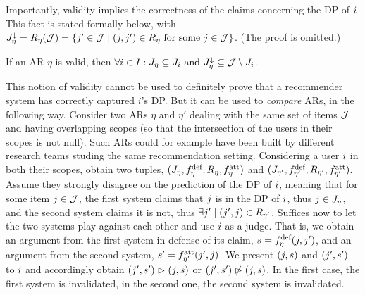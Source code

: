 \documentclass[version=3.21, pagesize, twoside=off, bibliography=totoc, DIV=calc, fontsize=12pt, a4paper, french, english]{scrartcl}
\begin{document}
Importantly, validity implies the correctness of the claims concerning the \ac{DP} of $\usr$  This fact is stated formally below, with $\mnitems = R_\eta(\allitems) = \set{\itm' \in \allitems \suchthat (\itm, \itm') \in R_\eta \text{ for some } \itm \in \allitems}$. (The proof is omitted.) 
\begin{theorem}
	If an \ac{AR} $\eta$ is valid, then $\forall \usr \in \allusers: \mitems \subseteq \uitems \text{ and } \mnitems \subseteq \allitems \setminus \uitems$.
\end{theorem}

This notion of validity cannot be used to definitely prove that a recommender system has correctly captured $i$’s \ac{DP}. But it can be used to \emph{compare} \acp{AR}, in the following way. Consider two \acp{AR} $\eta$ and $\eta'$ dealing with the same set of items $\allitems$ and having overlapping scopes (so that the intersection of the users in their scopes is not null). Such \acp{AR} could for example have been built by different research teams studing the same recommendation setting. Considering a user $\usr$ in both their scopes, obtain two tuples, $(\mitems, \mdef, R_\eta, \matt)$ and $(\mitems[\eta'], \mdef[\eta'], R_{\eta'}, \matt[\eta'])$. Assume they strongly disagree on the prediction of the \ac{DP} of $\usr$, meaning that for some item $\itm \in \allitems$, the first system claims that $\itm$ is in the \ac{DP} of $\usr$, thus $\itm \in \mitems$, and the second system claims it is not, thus $\exists \itm' \suchthat (\itm', \itm) \in R_{\eta'}$. Suffices now to let the two systems play against each other and use $\usr$ as a judge. That is, we obtain an argument from the first system in defense of its claim, $\ar = \mdef(\itm, \itm')$, and an argument from the second system, $\ar' = \matt[\eta'](\itm', \itm)$. We present $(\itm, \ar)$ and $(\itm', \ar')$ to $\usr$ and accordingly obtain $(\itm', \ar') \ibeats (\itm, \ar)$ or $(\itm', \ar') \nibeats (\itm, \ar)$. In the first case, the first system is invalidated, in the second one, the second system is invalidated.
\end{document}
